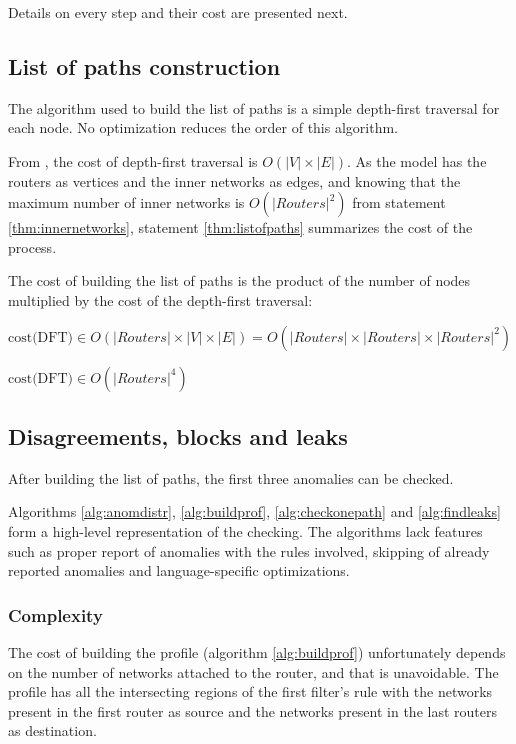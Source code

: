 Details on every step and their cost are presented next.



\subsection{List of paths construction}

The algorithm used to build the list of paths is a simple depth-first traversal
for each node. No optimization reduces the order of this algorithm.

From \cite{mitIntroAlgorithms}, the cost of depth-first traversal is
$O(|V|\times|E|)$. As the model has the routers as vertices and the inner
networks as edges, and knowing that the maximum number of inner networks is
$O(|Routers|^2)$ from statement \ref{thm:innernetworks}, statement
\ref{thm:listofpaths} summarizes the cost of the process.

\begin{mathstatement}
	\label{thm:listofpaths}
	The cost of building the list of paths is the product of the number of nodes
	multiplied by the cost of the depth-first traversal:

	$\mbox{cost(DFT)} \in O(|Routers|\times|V|\times|E|) = O(|Routers|\times|Routers|\times|Routers|^2)$

	$\mbox{cost(DFT)} \in O(|Routers|^4)$
\end{mathstatement}



\subsection{Disagreements, blocks and leaks}

After building the list of paths, the first three anomalies can be checked.

Algorithms \ref{alg:anomdistr}, \ref{alg:buildprof}, \ref{alg:checkonepath} and
\ref{alg:findleaks} form a high-level representation of the checking. The
algorithms lack features such as proper report of anomalies with the rules
involved, skipping of already reported anomalies and language-specific
optimizations.



\subsubsection{Complexity}

The cost of building the profile (algorithm \ref{alg:buildprof})
unfortunately depends on the number of networks attached to the router, and that
is unavoidable. The profile has all the intersecting regions of the first
filter's rule with the networks present in the first router as source and the
networks present in the last routers as destination.

